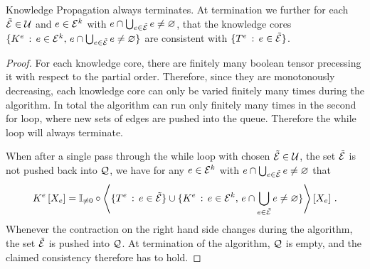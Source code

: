 \begin{theorem}
    Knowledge Propagation  always terminates.
    At termination we further for each $\tilde{\mathcal{E}}\in\mathcal{U}$ and $e\in\mathcal{E}^{k}$ with $e\cap\bigcup_{e\in\tilde{\mathcal{E}}}e\neq\varnothing$, that the knowledge cores $\{K^{e} \, : \, e\in\mathcal{E}^{k}, \, e\cap\bigcup_{e\in\tilde{\mathcal{E}}}e\neq\varnothing\}$ are consistent with $\{T^{e} \, : \, e\in\tilde{\mathcal{E}}\}$.
\end{theorem}
\begin{proof}
    For each knowledge core, there are finitely many boolean tensor precessing it with respect to the partial order.
    Therefore, since they are monotonously decreasing, each knowledge core can only be varied finitely many times during the algorithm.
    In total the algorithm can run only finitely many times in the second for loop, where new sets of edges are pushed into the queue.
    Therefore the while loop will always terminate.

    When after a single pass through the while loop with chosen $\tilde{\mathcal{E}}\in\mathcal{U}$, the set $\tilde{\mathcal{E}}$ is not pushed back into $\mathcal{Q}$, we have for any $e\in\mathcal{E}^{k}$ with $e\cap\bigcup_{e\in\tilde{\mathcal{E}}}e\neq\varnothing$ that
    \begin{align*}
        K^{e}\left[X_{e}\right]
        = \mathbb{I}_{\neq0}\circ\left\langle \{T^{e} \, : \, e\in\tilde{\mathcal{E}}\} \cup \{K^{e} \, : \, e\in\mathcal{E}^{k}, \, e\cap\bigcup_{e\in\tilde{\mathcal{E}}}e\neq\varnothing\}\right\rangle \left[ X_{e} \right] \, .
    \end{align*}
    Whenever the contraction on the right hand side changes during the algorithm, the set $\tilde{\mathcal{E}}$ is pushed into $\mathcal{Q}$.
    At termination of the algorithm, $\mathcal{Q}$ is empty, and the claimed consistency therefore has to hold.
\end{proof}



